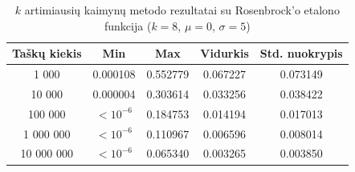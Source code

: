 \begin{table}[H]
    \centering
    \begin{tabular}{|c|c|c|c|c|}
        \hline
        \textbf{Taškų kiekis} & \textbf{Min} & \textbf{Max} & \textbf{Vidurkis} & \textbf{Std. nuokrypis} \\ \hline
        1 000        & 0.000108 & 0.552779 & 0.067227 & 0.073149 \\ \hline
        10 000       & 0.000004 & 0.303614 & 0.033256 & 0.038422 \\ \hline
        100 000      & $<10^{-6}$ & 0.184753 & 0.014194 & 0.017013 \\ \hline
        1 000 000    & $<10^{-6}$ & 0.110967 & 0.006596 & 0.008014 \\ \hline
        10 000 000   & $<10^{-6}$ & 0.065340 & 0.003265 & 0.003850 \\ \hline
    \end{tabular}
    \caption{$k$ artimiausių kaimynų metodo rezultatai su Rosenbrock'o etalono funkcija ($k = 8$, $\mu = 0$, $\sigma = 5$)}
\end{table}